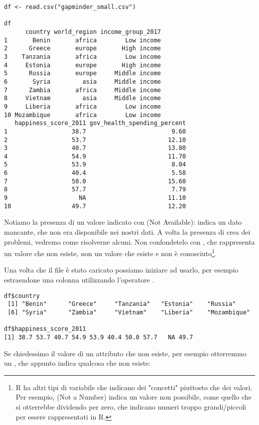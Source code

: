 \begin{lstlisting}[style=Rstyle]
df <- read.csv("gapminder_small.csv")

df
      country world_region income_group_2017
1       Benin       africa        Low income
2      Greece       europe       High income
3    Tanzania       africa        Low income
4     Estonia       europe       High income
5      Russia       europe     Middle income
6       Syria         asia     Middle income
7      Zambia       africa     Middle income
8     Vietnam         asia     Middle income
9     Liberia       africa        Low income
10 Mozambique       africa        Low income
   happiness_score_2011 gov_health_spending_percent
1                  38.7                        9.60
2                  53.7                       12.10
3                  40.7                       13.80
4                  54.9                       11.70
5                  53.9                        8.04
6                  40.4                        5.58
7                  50.0                       15.60
8                  57.7                        7.79
9                    NA                       11.10
10                 49.7                       12.20
\end{lstlisting}
%
Notiamo la presenza di un valore indicato con  (Not Available): indica un dato mancante, che non era disponibile nei nostri dati. A volta la presenza di  crea dei problemi, vedremo come risolverne alcuni. Non confondetelo con , che rappresenta un valore che non esiste, non un valore che esiste e non \`e conosciuto\footnote{R ha altri tipi di variabile che indicano dei "concetti" piuttosto che dei valori. Per esempio,  (Not a Number) indica un valore non possibile, come quello che si otterrebbe dividendo per zero,  che indicano numeri troppo grandi/piccoli per essere rappresentati in R.}.

\vspace{0.2cm}

\noindent  Una volta che il file \`e stato caricato possiamo iniziare ad usarlo, per esempio estraendone una colonna utilizzando l'operatore \lsin{$}. 

\begin{lstlisting}[style=Rstyle]
df$country
 [1] "Benin"      "Greece"     "Tanzania"   "Estonia"    "Russia"    
 [6] "Syria"      "Zambia"     "Vietnam"    "Liberia"    "Mozambique"
	
df$happiness_score_2011
[1] 38.7 53.7 40.7 54.9 53.9 40.4 50.0 57.7   NA 49.7
\end{lstlisting}
%
Se chiedessimo il valore di un attributo che non esiste, per esempio  otterremmo un , che appunto indica qualcosa che non esiste:

